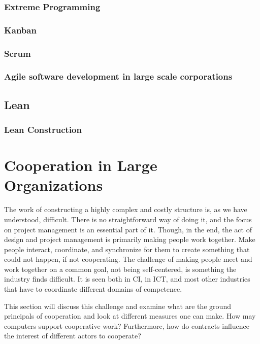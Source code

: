 \subsubsection{Extreme Programming}
\subsubsection{Kanban}
\subsubsection{Scrum} \label{sec:scrum}
\subsubsection{Agile software development in large scale corporations}
\subsection{Lean} \label{sec:lean}
\subsubsection*{Lean Construction} \label{sec:lean_construction}

\section{Cooperation in Large Organizations}
The work of constructing a highly complex and costly structure is, as we have understood, difficult. There is no straightforward way of doing it, and the focus on project management is an essential part of it. Though, in the end, the act of design and project management is primarily making people work together. Make people interact, coordinate, and synchronize for them to create something that could not happen, if not cooperating. The challenge of making people meet and work together on a common goal, not being self-centered, is something the industry finds difficult. It is seen both in CI, in ICT, and most other industries that have to coordinate different domains of competence. 

This section will discuss this challenge and examine what are the ground principals of cooperation and look at different measures one can make. How may computers support cooperative work? Furthermore, how do contracts influence the interest of different actors to cooperate? 

